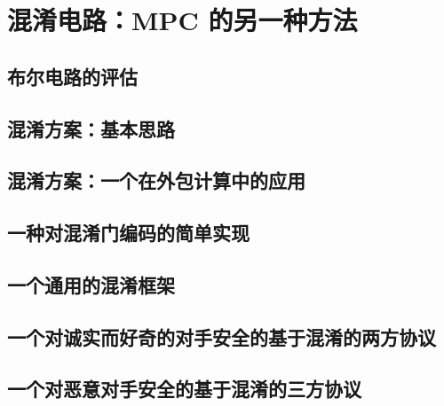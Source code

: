 \section{混淆电路：MPC 的另一种方法}\label{sec:22-3}

\subsection{布尔电路的评估}\label{subsec:22-3-1}

\subsection{混淆方案：基本思路}\label{subsec:22-3-2}

\subsection{混淆方案：一个在外包计算中的应用}\label{subsec:22-3-3}

\subsection{一种对混淆门编码的简单实现}\label{subsec:22-3-4}

\subsection{一个通用的混淆框架}\label{subsec:22-3-5}

\subsection{一个对诚实而好奇的对手安全的基于混淆的两方协议}\label{subsec:22-3-6}

\subsection{一个对恶意对手安全的基于混淆的三方协议}\label{subsec:22-3-7}